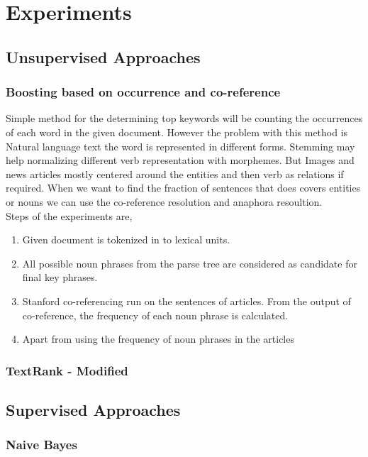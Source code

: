 \chapter{Experiments}

\section{Unsupervised Approaches}

\subsection{ Boosting based on occurrence and co-reference }

Simple method for the determining top keywords will be counting the occurrences of each word in the given document. However the problem with this method is Natural language text the word is represented in different forms. Stemming may help normalizing different verb representation with morphemes. But Images and news articles mostly centered around the entities and then verb as relations if required. When we want to find the fraction of sentences that does covers entities or nouns we can use the co-reference resolution and anaphora resoultion. \\

Steps of the experiments are, 
\begin{enumerate}
\item{Given document is tokenized in to lexical units.}
\item{All possible noun phrases from the parse tree are considered as candidate for final key phrases.}
\item{Stanford co-referencing run on the sentences of articles. From the output of co-reference, the frequency of each noun phrase is calculated.}
\item{Apart from using the frequency of noun phrases in the articles}
\end{enumerate}

\subsection{ TextRank - Modified  }


\section{Supervised Approaches}
\subsection{ Naive Bayes }


